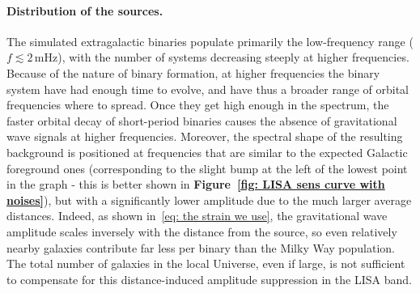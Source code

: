 \paragraph{Distribution of the sources.}
The simulated extragalactic binaries populate primarily the low-frequency range ($f \lesssim 2\,\mathrm{mHz}$), with the number of systems decreasing steeply at higher frequencies. 
Because of the nature of binary formation, at higher frequencies the binary system have had enough time to evolve, and have thus a broader range of orbital frequencies where to spread. 
Once they get high enough in the spectrum, the faster orbital decay of short-period binaries causes the absence of gravitational wave signals at higher frequencies.
Moreover, the spectral shape of the resulting background is positioned at frequencies that are similar to the expected Galactic foreground ones (corresponding to the slight bump at the left of the lowest point in the graph - this is better shown in \textbf{Figure~\ref{fig: LISA sens curve with noises}}), but with a significantly lower amplitude due to the much larger average distances.
Indeed, as shown in~\eqref{eq: the strain we use}, the gravitational wave amplitude scales inversely with the distance from the source, so even relatively nearby galaxies contribute far less per binary than the Milky Way population. 
The total number of galaxies in the local Universe, even if large, is not sufficient to compensate for this distance-induced amplitude suppression in the LISA band.
